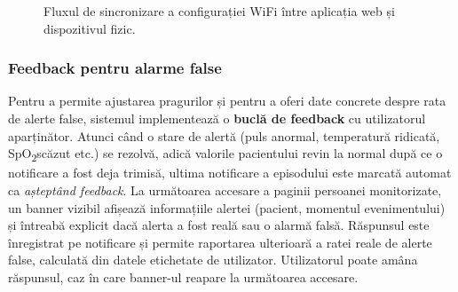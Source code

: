 \documentclass[12pt,a4paper,twoside]{article}
\newcommand{\spo}{SpO\textsubscript{2}}
\begin{document}
\begin{figure}[H]
\centering
{}
\caption{Fluxul de sincronizare a configurației WiFi între aplicația web și dispozitivul fizic.}
\label{fig:wifi-flow}
\end{figure}

\subsubsection{Feedback pentru alarme false}

Pentru a permite ajustarea pragurilor și pentru a oferi date concrete despre rata de alerte false, sistemul implementează o \textbf{buclă de feedback} cu utilizatorul aparținător. Atunci când o stare de alertă (puls anormal, temperatură ridicată, \spo scăzut etc.) se rezolvă, adică valorile pacientului revin la normal după ce o notificare a fost deja trimisă, ultima notificare a episodului este marcată automat ca \textit{așteptând feedback}. La următoarea accesare a paginii persoanei monitorizate, un banner vizibil afișează informațiile alertei (pacient, momentul evenimentului) și întreabă explicit dacă alerta a fost reală sau o alarmă falsă. Răspunsul este înregistrat pe notificare și permite raportarea ulterioară a ratei reale de alerte false, calculată din datele etichetate de utilizator. Utilizatorul poate amâna răspunsul, caz în care banner-ul reapare la următoarea accesare.
\end{document}
